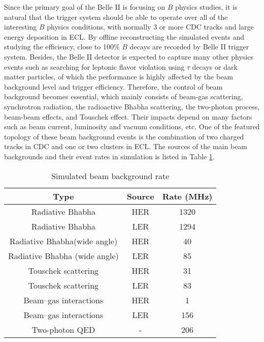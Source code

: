 Since the primary goal of the Belle II is focusing on $B$ physics studies, it is natural that the trigger system should be able to operate over all of the interesting $B$ physics conditions, with normally 3 or more CDC tracks and large energy deposition in ECL. By offline reconstructing the simulated events and studying the efficiency, close to 100\% $B$ decays are recorded by Belle II trigger system. Besides, the Belle II detector is expected to capture many other physics events such as searching for leptonic flavor violation using $\tau$ decays or dark matter particles, of which the performance is highly affected by the beam background level and trigger efficiency. Therefore, the control of beam background becomes essential, which mainly consists of beam-gas scattering, synchrotron radiation, the radioactive Bhabha scattering, the two-photon process, beam-beam effects, and Touschek effect. Their impacts depend on many factors such as beam current, luminosity and vacuum conditions, etc. One of the featured topology of these beam background events is the combination of two charged tracks in CDC and one or two clusters in ECL. The sources of the main beam backgrounds and their event rates in simulation is listed in Table \ref{tab:BG}.

\begin{table}[htbp]
	\centering
	\large
	\caption{Simulated beam background rate\cite{b2book}}
	\label{tab:BG}
	\begin{tabular}{c c c}
		\toprule
		Type & Source & Rate (MHz)\\
		\hline
		Radiative Bhabha & HER &  1320\\
		Radiative Bhabha & LER &  1294\\
		Radiative Bhabha(wide angle) & HER &  40\\
		Radiative Bhabha (wide angle) & LER &  85\\
		Touschek scattering & HER &  31\\
		Touschek scattering & LER &  83\\
		Beam–gas interactions & HER &  1\\
		Beam–gas interactions & LER &  156\\
		Two-photon QED & - & 206\\
		\bottomrule
	\end{tabular}
\end{table}
\begin{comment}
The improvements on both L1, HLT and the DAQ system are dedicated to serve the operation of the Belle II detector with much higher event rate in future. The further upgrades are also considered such as the replacement of the current DAQ module (COPPER board\cite{Abe:2010gxa} on the read-out PCs) with the latest PCIe-40 platform\cite{mitra2016gbt} to enlarge the bandwidth between detector front-end electronics and the event builder in Figure \ref{fig:daq}.
\end{comment}



